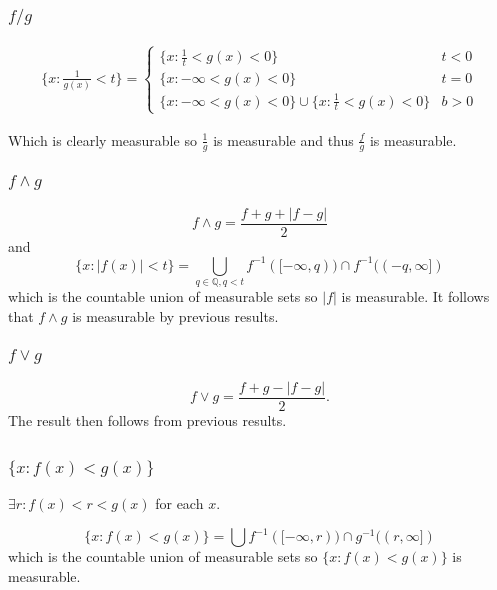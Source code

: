 \documentclass{unswmaths}
\begin{document}
\subsubsection{$ f/g $}

\begin{align*}
    \{ x : \frac{1}{g(x)} < t \} = 
    \begin{cases}
	\{ x : \frac{1}{t} < g(x) < 0 \} & t < 0 \\
	\{ x : -\infty < g(x) < 0 \} & t = 0\\
	\{ x : -\infty < g(x) < 0 \} \cup \{ x : \frac{1}{t} < g(x) < 0 \} & b > 0
    \end{cases}
\end{align*}

Which is clearly measurable so $ \frac{1}{g} $ is measurable and thus $ \frac{f}{g} $ is measurable.

\subsubsection{$ f \wedge g $}

$$ f \wedge g = \frac{f + g + |f-g| }{2} $$
and
$$
    \{ x : |f(x)| < t \} = \bigcup_{q \in \mathbb{Q}, q < t} f^{-1}([-\infty, q)) \cap f^{-1}((-q, \infty]) 
$$
which is the countable union of measurable sets so $ |f| $ is measurable. It follows that $ f \wedge g $ is measurable by previous results.

\subsubsection{$ f \vee g $}

$$ f \vee g = \frac{f + g - |f-g| }{2}. $$ The result then follows from previous results.

\subsection{}

\subsubsection{$\{ x : f(x) < g(x) \}$}

$ \exists r : f(x) < r < g(x) $ for each $ x $.

$$
    \{ x : f(x) < g(x) \} = \bigcup f^{-1}([-\infty, r)) \cap g^{-1}((r, \infty])
$$
which is the countable union of measurable sets so $ \{ x : f(x) < g(x) \} $ is measurable.
\end{document}
